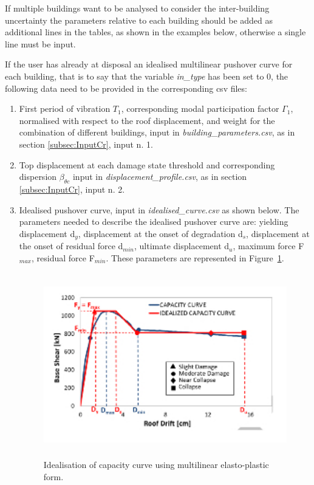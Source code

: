 If multiple buildings want to be analysed to consider the inter-building uncertainty the parameters relative to each building should be added as additional lines in the tables, as shown in the examples below, otherwise a single line must be input.

If the user has already at disposal an idealised multilinear pushover curve for each building, that is to say that the variable \textit{in\_type} has been set to 0, the following data need to be provided in the corresponding csv files:

\begin{enumerate}
\item First period of vibration $T_1$, corresponding modal participation factor $\Gamma_1$, normalised with respect to the roof displacement, and weight for the combination of different buildings, input in \textit{building\_parameters.csv}, as in section \ref{subsec:InputCr}, input n. 1.
	
\item Top displacement at each damage state threshold and corresponding dispersion $\beta_{\theta c}$ input in \textit{displacement\_profile.csv}, as in section \ref{subsec:InputCr}, input n. 2. 
	
\item Idealised pushover curve, input in \textit{idealised\_curve.csv} as shown below. The parameters needed to describe the idealised pushover curve are: yielding displacement d$_y$, displacement at the onset of degradation d$_s$, displacement at the onset of residual force d$_{min}$, ultimate displacement d$_u$, maximum force F$_{max}$, residual force F$_{min}$. These parameters are represented in Figure~\ref{fig:quadrilinear}.

\begin{figure}[H]
\centering
\includegraphics[width=12cm,height=8cm]{./figures/quadrilinear.jpg}
\caption{Idealisation of capacity curve using multilinear elasto-plastic form.}
\label{fig:quadrilinear}
\end{figure}


\end{enumerate}

